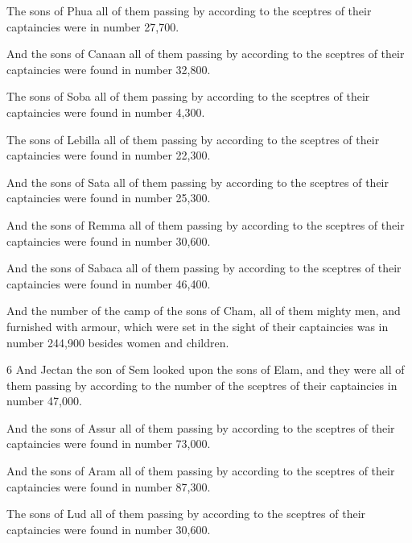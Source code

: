 \par The sons of Phua all of them passing by according to the sceptres of their captaincies were in number 27,700.

\par And the sons of Canaan all of them passing by according to the sceptres of their captaincies were found in number 32,800.

\par The sons of Soba all of them passing by according to the sceptres of their captaincies were found in number 4,300.

\par The sons of Lebilla all of them passing by according to the sceptres of their captaincies were found in number 22,300.

\par And the sons of Sata all of them passing by according to the sceptres of their captaincies were found in number 25,300.

\par And the sons of Remma all of them passing by according to the sceptres of their captaincies were found in number 30,600.

\par And the sons of Sabaca all of them passing by according to the sceptres of their captaincies were found in number 46,400.

\par And the number of the camp of the sons of Cham, all of them mighty men, and furnished with armour, which were set in the sight of their captaincies was in number 244,900 besides women and children.

\par 6 And Jectan the son of Sem looked upon the sons of Elam, and they were all of them passing by according to the number of the sceptres of their captaincies in number 47,000.

\par And the sons of Assur all of them passing by according to the sceptres of their captaincies were found in number 73,000.

\par And the sons of Aram all of them passing by according to the sceptres of their captaincies were found in number 87,300.

\par The sons of Lud all of them passing by according to the sceptres of their captaincies were found in number 30,600.

\par [The number of the sons of Cham was 73,000.]

